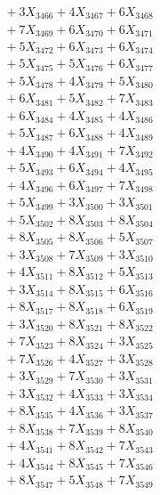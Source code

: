 \documentclass[a4paper,10pt]{article}
\begin{document}
{\begin{align}
&\;  + 3 X_{3466} + 4 X_{3467} + 6 X_{3468} \\[0.3ex]
&\;  + 7 X_{3469} + 6 X_{3470} + 6 X_{3471} \\[0.3ex]
&\;  + 5 X_{3472} + 6 X_{3473} + 6 X_{3474} \\[0.3ex]
&\;  + 5 X_{3475} + 5 X_{3476} + 6 X_{3477} \\[0.3ex]
&\;  + 5 X_{3478} + 4 X_{3479} + 5 X_{3480} \\[0.3ex]
&\;  + 6 X_{3481} + 5 X_{3482} + 7 X_{3483} \\[0.3ex]
&\;  + 6 X_{3484} + 4 X_{3485} + 4 X_{3486} \\[0.3ex]
&\;  + 5 X_{3487} + 6 X_{3488} + 4 X_{3489} \\[0.5ex]\allowbreak
&\;  + 4 X_{3490} + 4 X_{3491} + 7 X_{3492} \\[0.3ex]
&\;  + 5 X_{3493} + 6 X_{3494} + 4 X_{3495} \\[0.3ex]
&\;  + 4 X_{3496} + 6 X_{3497} + 7 X_{3498} \\[0.3ex]
&\;  + 5 X_{3499} + 3 X_{3500} + 3 X_{3501} \\[0.3ex]
&\;  + 5 X_{3502} + 8 X_{3503} + 8 X_{3504} \\[0.3ex]
&\;  + 8 X_{3505} + 8 X_{3506} + 5 X_{3507} \\[0.3ex]
&\;  + 3 X_{3508} + 7 X_{3509} + 3 X_{3510} \\[0.3ex]
&\;  + 4 X_{3511} + 8 X_{3512} + 5 X_{3513} \\[0.3ex]
&\;  + 3 X_{3514} + 8 X_{3515} + 6 X_{3516} \\[0.3ex]
&\;  + 8 X_{3517} + 8 X_{3518} + 6 X_{3519} \\[0.5ex]\allowbreak
&\;  + 3 X_{3520} + 8 X_{3521} + 8 X_{3522} \\[0.3ex]
&\;  + 7 X_{3523} + 8 X_{3524} + 3 X_{3525} \\[0.3ex]
&\;  + 7 X_{3526} + 4 X_{3527} + 3 X_{3528} \\[0.3ex]
&\;  + 3 X_{3529} + 7 X_{3530} + 3 X_{3531} \\[0.3ex]
&\;  + 3 X_{3532} + 4 X_{3533} + 3 X_{3534} \\[0.3ex]
&\;  + 8 X_{3535} + 4 X_{3536} + 3 X_{3537} \\[0.3ex]
&\;  + 8 X_{3538} + 7 X_{3539} + 8 X_{3540} \\[0.3ex]
&\;  + 4 X_{3541} + 8 X_{3542} + 7 X_{3543} \\[0.3ex]
&\;  + 4 X_{3544} + 8 X_{3545} + 7 X_{3546} \\[0.3ex]
&\;  + 8 X_{3547} + 5 X_{3548} + 7 X_{3549} \\[0.5ex]\allowbreak

\end{align}}
\end{document}
